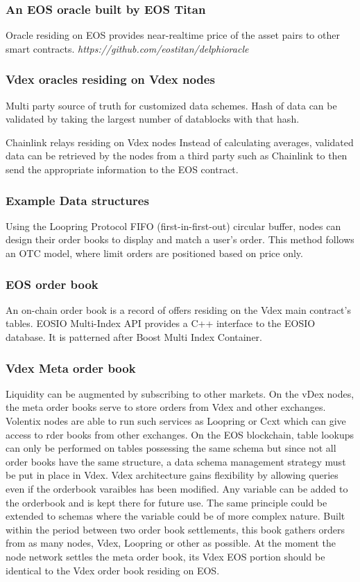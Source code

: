 \documentclass[]{article}
\begin{document}
{\subsubsection{An EOS oracle built by EOS Titan}
Oracle residing on EOS provides near-realtime price of the asset pairs to other smart contracts.
\textit{https://github.com/eostitan/delphioracle} 

\subsubsection{Vdex oracles residing on Vdex nodes}
Multi party source of truth for customized data schemes.
Hash of data can be validated by taking the largest number 
of datablocks with that hash.

{Chainlink relays residing on Vdex nodes}
Instead of calculating averages, validated data can be retrieved by the nodes from a third party such as Chainlink to then send the appropriate information to the EOS contract.


\subsubsection{Example Data structures}

Using the Loopring Protocol FIFO (first-in-first-out) circular buffer, nodes can design their order books to display and match a user’s order. This method follows an OTC model, where limit orders are positioned based on price only. \cite{7}  

\subsubsection{EOS order book}
An on-chain order book is a record of offers residing on the Vdex main contract's tables. 
EOSIO Multi-Index API provides a C++ interface to the EOSIO database. It is patterned after Boost Multi Index Container. 

\subsubsection{Vdex Meta order book}
Liquidity can be augmented by subscribing to other markets.
On the vDex nodes, the meta order books serve to store orders from Vdex and other exchanges. Volentix nodes are able to run such services as Loopring or Ccxt which can give access to rder books from other exchanges.
On the EOS blockchain, table lookups can only be performed on tables possessing the same schema but since not all order books have the same structure, a data schema management strategy must be put in place in Vdex. 
Vdex architecture gains flexibility by allowing queries even if the orderbook varaibles has been modified. Any variable can be added to the orderbook and is kept there for future use. 
The same principle could be extended to schemas where the variable could be of more complex nature.
Built within the period between two order book settlements, this book gathers orders from as many nodes, Vdex, Loopring or other as possible. At the moment the node network settles the meta order book, its Vdex EOS portion should be identical to the Vdex order book residing on EOS.

}
\end{document}
